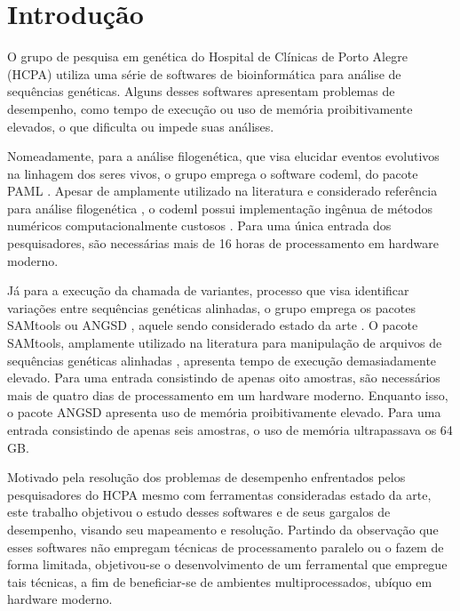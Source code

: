\documentclass[cic,tc]{iiufrgs}
\begin{document}
\tableofcontents

%
%
%
%

\chapter{Introdução}

%
%
O grupo de pesquisa em genética do Hospital de Clínicas de Porto Alegre (HCPA)
utiliza uma série de softwares de bioinformática para análise de sequências
genéticas. Alguns desses softwares apresentam problemas de desempenho, como
tempo de execução ou uso de memória proibitivamente elevados, o que dificulta
ou impede suas análises.

Nomeadamente, para a análise filogenética, que visa elucidar eventos evolutivos
na linhagem dos seres vivos, o grupo emprega o software codeml, do pacote
PAML \cite{yang2007paml}. Apesar de amplamente utilizado na literatura e
considerado referência para análise filogenética \cite{maldonado2016lmap}, o
codeml possui implementação ingênua de métodos numéricos computacionalmente
custosos \cite{yang2020paml}. Para uma única entrada dos pesquisadores, são
necessárias mais de 16 horas de processamento em hardware moderno.

Já para a execução da chamada de variantes, processo que visa identificar
variações entre sequências genéticas alinhadas, o grupo emprega os pacotes
SAMtools \cite{li2009sequence} ou ANGSD \cite{korneliussen2014angsd}, aquele
sendo considerado estado da
arte \cite{poplin2018universal} \cite{yao2020evaluation}. O pacote SAMtools,
amplamente utilizado na literatura para manipulação de arquivos de sequências
genéticas alinhadas \cite{danecek2021twelve}, apresenta tempo de execução
demasiadamente elevado. Para uma entrada consistindo de apenas oito amostras,
são necessários mais de quatro dias de processamento em um hardware moderno.
Enquanto isso, o pacote ANGSD apresenta uso de memória proibitivamente elevado.
Para uma entrada consistindo de apenas seis amostras, o uso de memória
ultrapassava os 64 GB.


%
%
Motivado pela resolução dos problemas de desempenho enfrentados pelos
pesquisadores do HCPA mesmo com ferramentas consideradas estado da arte, este
trabalho objetivou o estudo desses softwares e de seus gargalos de desempenho,
visando seu mapeamento e resolução. Partindo da observação que esses softwares
não empregam técnicas de processamento paralelo ou o fazem de forma limitada,
objetivou-se o desenvolvimento de um ferramental que empregue tais técnicas, a
fim de beneficiar-se de ambientes multiprocessados, ubíquo em hardware moderno.
\end{document}
